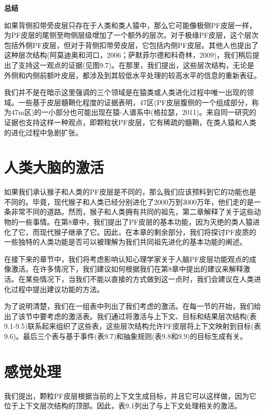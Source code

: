 \textbf{总结}
\par
如果背侧扣带旁皮层只存在于人类和类人猿中，那么它可能像极侧PF皮层一样，为PF皮层的尾侧至吻侧层级增加了一个额外的层次。对于极缘PF皮层，这个层次包括外侧PF皮层，但对于背侧扣带旁皮层，它包括内侧PF皮层。其他人也提出了这种层次结构(阿莫迪奥和河口，2006；萨默菲尔德和科奇林，2009)，我们稍后提出了支持这一观点的证据(见图9.7)。在那里，我们提出，这些层次结构，无论是外侧和内侧前额叶皮层，都涉及到其较低水平处理的较高水平的信息的重新表征。
\par
我们并不是在暗示这里强调的三个领域是在猿类或人类进化过程中唯一出现的领域。一些基于皮层髓鞘化程度的证据表明，47区(PF皮层腹侧的一个组成部分，称为47m区)的一小部分也可能出现在猿-人谱系中(格拉瑟，2011)。来自同一研究的证据也支持这样一种观点，即颗粒状PF皮层，它有稀疏的髓鞘，在类人猿和人类的进化过程中急剧扩张。

\section{人类大脑的激活}
\par
如果我们承认猴子和人类的PF皮层是不同的，那么我们应该预料到它的功能也是不同的。毕竟，现代猴子和人类已经分别进化了2000万到3000万年，他们走的是一条非常不同的道路。然而，猴子和人类拥有共同的祖先，第二章解释了关于这些动物的一些事情。在第8章中，我们提出了PF皮层的基本功能，因为灭绝的类人猿进化了它，而现代猴子继承了它。因此，在本章的剩余部分，我们将探讨PF皮质的一些独特的人类功能是否可以被理解为我们共同祖先进化的基本功能的阐述。
\par
在接下来的章节中，我们将考虑影响认知心理学家关于人脑PF皮层功能观点的成像激活。在许多情况下，我们建议如何根据我们在第8章中提出的建议来解释激活。在某些情况下，当我们不能以直接的方式做到这一点时，我们会建议在人类进化过程中提出建议功能的方法。
\par
为了说明清楚，我们在一组表中列出了我们考虑的激活。在每一节的开始，我们给出了该节中要考虑的激活表。我们通过将激活与上下文、目标和结果层次结构(表9.1-9.5)联系起来组织了这些表，这些层次结构允许PF皮层将上下文映射到目标(表9.6)。最后三个表与基于事件(表9.7)和抽象规则(表9.8和9.9)的目标生成有关。
\section{感觉处理}
我们提出，颗粒PF皮层根据当前的上下文生成目标，并且它可以这样做，因为它位于上下文层次结构的顶部。因此，表9.1列出了与上下文处理相关的激活。
